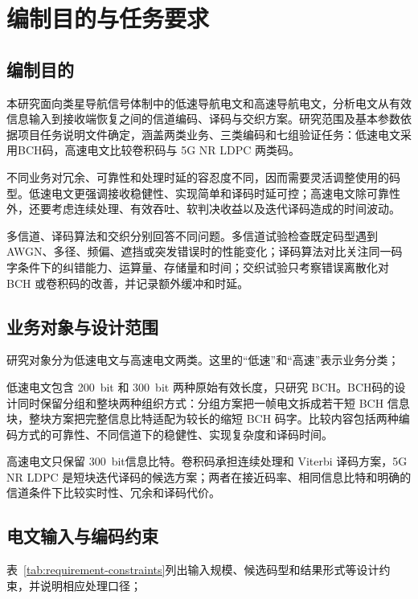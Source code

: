 \chapter{编制目的与任务要求}\label{chap:purpose}

\section{编制目的}

本研究面向类星导航信号体制中的低速导航电文和高速导航电文，分析电文从有效信息输入到接收端恢复之间的信道编码、译码与交织方案。研究范围及基本参数依据项目任务说明文件确定，涵盖两类业务、三类编码和七组验证任务：低速电文采用BCH码，高速电文比较卷积码与 5G NR LDPC 两类码。

不同业务对冗余、可靠性和处理时延的容忍度不同，因而需要灵活调整使用的码型。低速电文更强调接收稳健性、实现简单和译码时延可控；高速电文除可靠性外，还要考虑连续处理、有效吞吐、软判决收益以及迭代译码造成的时间波动。

多信道、译码算法和交织分别回答不同问题。多信道试验检查既定码型遇到 AWGN、多径、频偏、遮挡或突发错误时的性能变化；译码算法对比关注同一码字条件下的纠错能力、运算量、存储量和时间；交织试验只考察错误离散化对 BCH 或卷积码的改善，并记录额外缓冲和时延。

\section{业务对象与设计范围}

研究对象分为低速电文与高速电文两类。这里的“低速”和“高速”表示业务分类；

低速电文包含 \SI{200}{bit} 和 \SI{300}{bit} 两种原始有效长度，只研究 BCH。BCH码的设计同时保留分组和整块两种组织方式：分组方案把一帧电文拆成若干短 BCH 信息块，整块方案把完整信息比特适配为较长的缩短 BCH 码字。比较内容包括两种编码方式的可靠性、不同信道下的稳健性、实现复杂度和译码时间。

高速电文只保留 \SI{300}{bit}信息比特。卷积码承担连续处理和 Viterbi 译码方案，5G NR LDPC 是短块迭代译码的候选方案；两者在接近码率、相同信息比特和明确的信道条件下比较实时性、冗余和译码代价。

\section{电文输入与编码约束}

表~\ref{tab:requirement-constraints}列出输入规模、候选码型和结果形式等设计约束，并说明相应处理口径；

